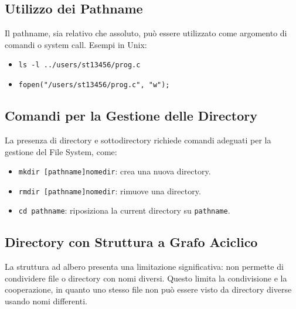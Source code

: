 \subsection{Utilizzo dei Pathname}
Il pathname, sia relativo che assoluto, può essere utilizzato come argomento di comandi o system call. Esempi in Unix:
\begin{itemize}
    \item \texttt{ls -l ../users/st13456/prog.c}
    \item \texttt{fopen("/users/st13456/prog.c", "w");}
\end{itemize}


\subsection{Comandi per la Gestione delle Directory}
La presenza di directory e sottodirectory richiede comandi adeguati per la gestione del File System, come:
\begin{itemize}
    \item \texttt{mkdir [pathname]nomedir}: crea una nuova directory.
    \item \texttt{rmdir [pathname]nomedir}: rimuove una directory.
    \item \texttt{cd pathname}: riposiziona la current directory su \texttt{pathname}.
\end{itemize}


\subsection{Directory con Struttura a Grafo Aciclico}
La struttura ad albero presenta una limitazione significativa: non permette di condividere file o directory con nomi diversi. Questo limita la condivisione e la cooperazione, in quanto uno stesso file non può essere visto da directory diverse usando nomi differenti. 


